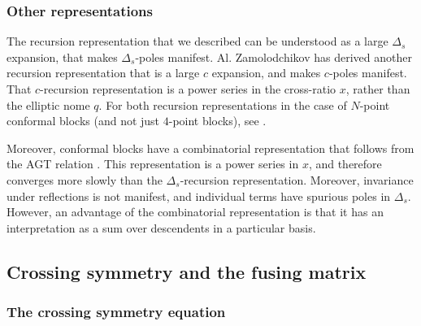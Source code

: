 \documentclass[12pt, a4paper, notitlepage, twoside]{report}
\numberwithin{equation}{section}
\theoremstyle{break}
\begin{document}
\subsubsection{Other representations}

The recursion representation that we described can be understood as a large $\Delta_s$ expansion, that makes $\Delta_s$-poles manifest. Al. Zamolodchikov has derived another recursion representation that is a large $c$ expansion, and makes $c$-poles manifest. That $c$-recursion representation is a power series in the cross-ratio $x$, rather than the elliptic nome $q$. For both recursion representations in the case of $N$-point conformal blocks (and not just $4$-point blocks), see \cite{ccy17}.

Moreover, conformal blocks have a combinatorial representation that follows from the AGT relation \cite{aflt10}. 
This representation is a power series in $x$, and therefore converges more slowly than the $\Delta_s$-recursion representation. 
Moreover, invariance under reflections is not manifest, and individual terms have spurious poles in $\Delta_s$.
However, an advantage of the combinatorial representation is that it has an interpretation as a sum over descendents in a particular basis.


\subsection{Crossing symmetry and the fusing matrix}

\subsubsection{The crossing symmetry equation}
\end{document}
